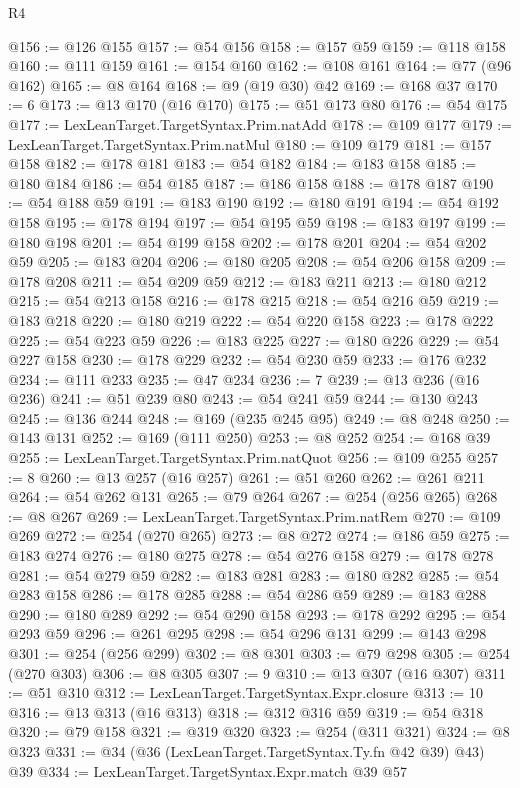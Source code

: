 \begin{lexlean}{R4}
\begin{coremodule}
@156 := @126 @155
@157 := @54 @156
@158 := @157 @59
@159 := @118 @158
@160 := @111 @159
@161 := @154 @160
@162 := @108 @161
@164 := @77 (@96 @162)
@165 := @8 @164
@168 := @9 (@19 @30) @42
@169 := @168 @37
@170 := 6
@173 := @13 @170 (@16 @170)
@175 := @51 @173 @80
@176 := @54 @175
@177 := LexLeanTarget.TargetSyntax.Prim.natAdd
@178 := @109 @177
@179 := LexLeanTarget.TargetSyntax.Prim.natMul
@180 := @109 @179
@181 := @157 @158
@182 := @178 @181
@183 := @54 @182
@184 := @183 @158
@185 := @180 @184
@186 := @54 @185
@187 := @186 @158
@188 := @178 @187
@190 := @54 @188 @59
@191 := @183 @190
@192 := @180 @191
@194 := @54 @192 @158
@195 := @178 @194
@197 := @54 @195 @59
@198 := @183 @197
@199 := @180 @198
@201 := @54 @199 @158
@202 := @178 @201
@204 := @54 @202 @59
@205 := @183 @204
@206 := @180 @205
@208 := @54 @206 @158
@209 := @178 @208
@211 := @54 @209 @59
@212 := @183 @211
@213 := @180 @212
@215 := @54 @213 @158
@216 := @178 @215
@218 := @54 @216 @59
@219 := @183 @218
@220 := @180 @219
@222 := @54 @220 @158
@223 := @178 @222
@225 := @54 @223 @59
@226 := @183 @225
@227 := @180 @226
@229 := @54 @227 @158
@230 := @178 @229
@232 := @54 @230 @59
@233 := @176 @232
@234 := @111 @233
@235 := @47 @234
@236 := 7
@239 := @13 @236 (@16 @236)
@241 := @51 @239 @80
@243 := @54 @241 @59
@244 := @130 @243
@245 := @136 @244
@248 := @169 (@235 @245 @95)
@249 := @8 @248
@250 := @143 @131
@252 := @169 (@111 @250)
@253 := @8 @252
@254 := @168 @39
@255 := LexLeanTarget.TargetSyntax.Prim.natQuot
@256 := @109 @255
@257 := 8
@260 := @13 @257 (@16 @257)
@261 := @51 @260
@262 := @261 @211
@264 := @54 @262 @131
@265 := @79 @264
@267 := @254 (@256 @265)
@268 := @8 @267
@269 := LexLeanTarget.TargetSyntax.Prim.natRem
@270 := @109 @269
@272 := @254 (@270 @265)
@273 := @8 @272
@274 := @186 @59
@275 := @183 @274
@276 := @180 @275
@278 := @54 @276 @158
@279 := @178 @278
@281 := @54 @279 @59
@282 := @183 @281
@283 := @180 @282
@285 := @54 @283 @158
@286 := @178 @285
@288 := @54 @286 @59
@289 := @183 @288
@290 := @180 @289
@292 := @54 @290 @158
@293 := @178 @292
@295 := @54 @293 @59
@296 := @261 @295
@298 := @54 @296 @131
@299 := @143 @298
@301 := @254 (@256 @299)
@302 := @8 @301
@303 := @79 @298
@305 := @254 (@270 @303)
@306 := @8 @305
@307 := 9
@310 := @13 @307 (@16 @307)
@311 := @51 @310
@312 := LexLeanTarget.TargetSyntax.Expr.closure
@313 := 10
@316 := @13 @313 (@16 @313)
@318 := @312 @316 @59
@319 := @54 @318
@320 := @79 @158
@321 := @319 @320
@323 := @254 (@311 @321)
@324 := @8 @323
@331 := @34 (@36 (LexLeanTarget.TargetSyntax.Ty.fn @42 @39) @43) @39
@334 := LexLeanTarget.TargetSyntax.Expr.match @39 @57

\end{coremodule}
\end{lexlean}
